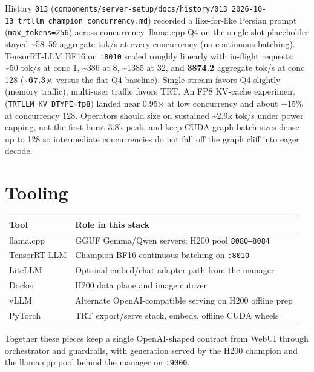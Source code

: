 History \texttt{013} (\texttt{components/server-setup/docs/history/013\_2026-10-13\_trtllm\_champion\_concurrency.md}) recorded a like-for-like Persian prompt (\texttt{max\_tokens=256}) across concurrency. llama.cpp Q4 on the single-slot placeholder stayed \textasciitilde58--59 aggregate tok/s at every concurrency (no continuous batching). TensorRT-LLM BF16 on \texttt{:8010} scaled roughly linearly with in-flight requests: \textasciitilde50 tok/s at conc 1, \textasciitilde386 at 8, \textasciitilde1385 at 32, and \textbf{3874.2} aggregate tok/s at conc 128 (\textasciitilde{}\textbf{67.3×} versus the flat Q4 baseline). Single-stream favors Q4 slightly (memory traffic); multi-user traffic favors TRT. An FP8 KV-cache experiment (\texttt{TRTLLM\_KV\_DTYPE=fp8}) landed near 0.95× at low concurrency and about +15\% at concurrency 128. Operators should size on sustained \textasciitilde2.9k tok/s under power capping, not the first-burst 3.8k peak, and keep CUDA-graph batch sizes dense up to 128 so intermediate concurrencies do not fall off the graph cliff into eager decode.

\section{Tooling}\label{tooling}

\begin{longtable}[]{@{}ll@{}}
\toprule\noalign{}
Tool & Role in this stack \\
\midrule\noalign{}
\endhead
\bottomrule\noalign{}
\endlastfoot
llama.cpp & GGUF Gemma/Qwen servers; H200 pool \texttt{8080–8084} \\
TensorRT-LLM & Champion BF16 continuous batching on \texttt{:8010} \\
LiteLLM & Optional embed/chat adapter path from the manager \\
Docker & H200 data plane and image cutover \\
vLLM & Alternate OpenAI-compatible serving on H200 offline prep \\
PyTorch & TRT export/serve stack, embeds, offline CUDA wheels \\
\end{longtable}

Together these pieces keep a single OpenAI-shaped contract from WebUI through orchestrator and guardrails, with generation served by the H200 champion and the llama.cpp pool behind the manager on \texttt{:9000}.
